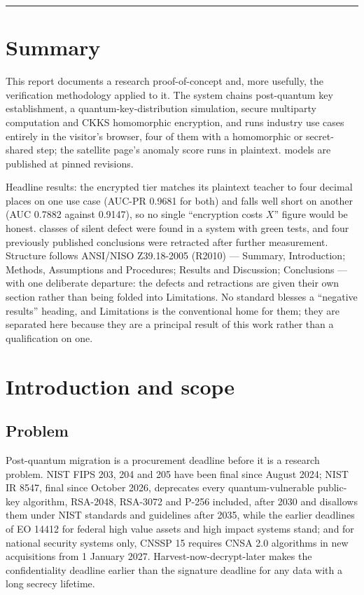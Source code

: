 \documentclass[11pt,a4paper]{article}
\begin{document}
\noindent\rule{\textwidth}{0.4pt}

\tableofcontents
\newpage

\section{Summary}
This report documents a research proof-of-concept and, more usefully, the verification methodology
applied to it. The system chains post-quantum key establishment, a quantum-key-distribution
simulation, secure multiparty computation and CKKS homomorphic encryption, and runs \nusecases{}
industry use cases entirely in the visitor's browser, four of them with a homomorphic or
secret-shared step; the satellite page's anomaly score runs in plaintext. \npublished{} models are
published at pinned revisions.

Headline results: the encrypted tier matches its plaintext teacher to four decimal places on one use
case (AUC-PR 0.9681 for both) and falls well short on another (AUC 0.7882 against 0.9147), so no single
``encryption costs $X$'' figure would be honest. \ndefectclasses{} classes of silent defect were
found in a system with green tests, and four previously published conclusions were retracted after
further measurement. Structure follows ANSI/NISO Z39.18-2005 (R2010) --- Summary, Introduction; Methods,
Assumptions and Procedures; Results and Discussion; Conclusions --- with one deliberate departure:
the defects and retractions are given their own section rather than being folded into Limitations.
No standard blesses a ``negative results'' heading, and Limitations is the conventional home for
them; they are separated here because they are a principal result of this work rather than a
qualification on one.

\section{Introduction and scope}

\subsection{Problem}
Post-quantum migration is a procurement deadline before it is a research problem. NIST FIPS 203, 204
and 205 have been final since August 2024; NIST IR 8547, final since October 2026, deprecates every
quantum-vulnerable public-key algorithm, RSA-2048, RSA-3072 and P-256 included, after 2030 and
disallows them under NIST standards and guidelines after 2035, while the earlier deadlines of EO 14412
for federal high value assets and high impact systems stand; and for national security systems only,
CNSSP 15 requires CNSA 2.0 algorithms in new acquisitions from 1 January 2027.
Harvest-now-decrypt-later makes the confidentiality deadline earlier than the signature deadline for
any data with a long secrecy lifetime.
\end{document}
